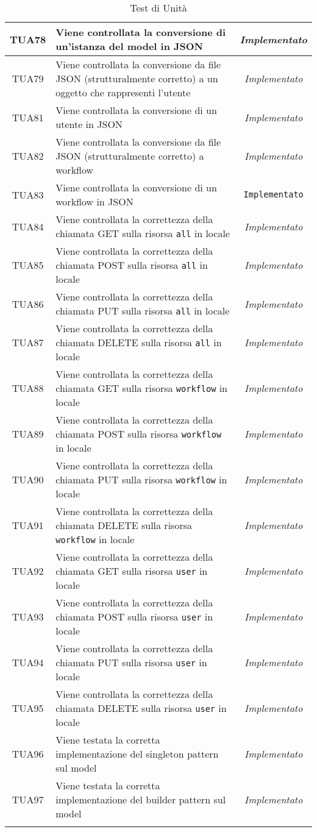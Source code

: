 \begin{longtable}{|c|m{12em}|c|}
TUA78 & Viene controllata la conversione di un'istanza del model in JSON& \textit{Implementato}\\ \hline
TUA79 & Viene controllata la conversione da file JSON (strutturalmente corretto) a un oggetto che rappresenti l'utente& \textit{Implementato}\\ \hline
TUA81 & Viene controllata la conversione di un utente in JSON& \textit{Implementato}\\ \hline
TUA82 & Viene controllata la conversione da file JSON (strutturalmente corretto) a workflow& \textit{Implementato}\\ \hline
TUA83 & Viene controllata la conversione di un workflow in JSON& \texttt{Implementato}\\ \hline
TUA84 & Viene controllata la correttezza della chiamata GET sulla risorsa \texttt{all} in locale& \textit{Implementato}\\ \hline
TUA85 & Viene controllata la correttezza della chiamata POST sulla risorsa \texttt{all} in locale& \textit{Implementato}\\ \hline
TUA86 & Viene controllata la correttezza della chiamata PUT sulla risorsa \texttt{all} in locale& \textit{Implementato}\\ \hline
TUA87 & Viene controllata la correttezza della chiamata DELETE sulla risorsa \texttt{all} in locale& \textit{Implementato}\\ \hline
TUA88 & Viene controllata la correttezza della chiamata GET sulla risorsa \texttt{workflow} in locale& \textit{Implementato}\\ \hline
TUA89 & Viene controllata la correttezza della chiamata POST sulla risorsa \texttt{workflow} in locale& \textit{Implementato}\\ \hline
TUA90 & Viene controllata la correttezza della chiamata PUT sulla risorsa \texttt{workflow} in locale& \textit{Implementato}\\ \hline
TUA91 & Viene controllata la correttezza della chiamata DELETE sulla risorsa \texttt{workflow} in locale& \textit{Implementato}\\ \hline
TUA92 & Viene controllata la correttezza della chiamata GET sulla risorsa \texttt{user} in locale& \textit{Implementato}\\ \hline
TUA93 & Viene controllata la correttezza della chiamata POST sulla risorsa \texttt{user} in locale& \textit{Implementato}\\ \hline
TUA94 & Viene controllata la correttezza della chiamata PUT sulla risorsa \texttt{user} in locale& \textit{Implementato}\\ \hline
TUA95 & Viene controllata la correttezza della chiamata DELETE sulla risorsa \texttt{user} in locale& \textit{Implementato}\\ \hline
TUA96 & Viene testata la corretta implementazione del singleton pattern sul model&  \textit{Implementato}\\ \hline
TUA97 & Viene testata la corretta implementazione del builder pattern sul model& \textit{Implementato}\\ \hline

\caption[Test di Unità]{Test di Unità}
\label{tabella:test2}
\end{longtable}
\clearpage

